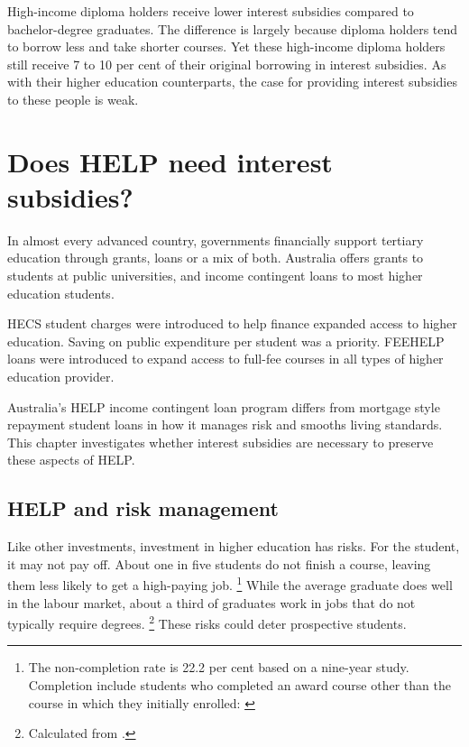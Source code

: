\documentclass[embargoed]{grattan}
\begin{document}
High-income diploma holders receive lower interest subsidies compared to bachelor-degree graduates.
The difference is largely because diploma holders tend to borrow less and take shorter courses.
Yet these high-income diploma holders still receive 7 to 10 per cent of their original borrowing in interest subsidies.
As with their higher education counterparts, the case for providing interest subsidies to these people is weak.

\chapter[Does HELP need interest subsidies?]{Does \gls{HELP} need interest subsidies?}\label{chap:4-does-help-need-interest-subsidies}

In almost every advanced country, governments financially support tertiary education through grants, loans or a mix of both.
Australia offers grants to students at public universities, and income contingent loans to most higher education students.

\gls{HECS} student charges were introduced to help finance expanded access to higher education.
Saving on public expenditure per student was a priority.
\gls{FEEHELP} loans were introduced to expand access to full-fee courses in all types of higher education provider.

Australia's \gls{HELP} income contingent loan program differs from mortgage style repayment student loans in how it manages risk and smooths living standards.
This chapter investigates whether interest subsidies are necessary to preserve these aspects of \gls{HELP}.

\section[HELP and risk management]{\gls{HELP} and risk management}\label{help-and-risk-management}

Like other investments, investment in higher education has risks.
For the student, it may not pay off.
About one in five students do not finish a course, leaving them less likely to get a high-paying job.%
\footnote{The non-completion rate is 22.2 per cent based on a nine-year study.
Completion include students who completed an award course other than the course in which they initially enrolled: \textcite{Education2015Completionratesdomestic}} While the average graduate does well in the labour market, about a third of graduates work in jobs that do not typically require degrees.%
\footnote{Calculated from \textcite[][table 10]{ABS2015Educationwork2015}.} These risks could deter prospective students.
\end{document}
